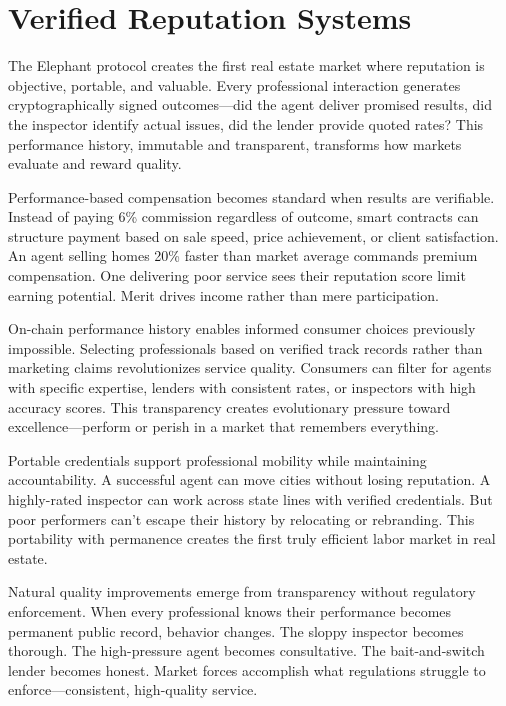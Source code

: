 \section{Verified Reputation Systems}

The Elephant protocol creates the first real estate market where reputation is objective, portable, and valuable. Every professional interaction generates cryptographically signed outcomes—did the agent deliver promised results, did the inspector identify actual issues, did the lender provide quoted rates? This performance history, immutable and transparent, transforms how markets evaluate and reward quality.

Performance-based compensation becomes standard when results are verifiable. Instead of paying 6\% commission regardless of outcome, smart contracts can structure payment based on sale speed, price achievement, or client satisfaction. An agent selling homes 20\% faster than market average commands premium compensation. One delivering poor service sees their reputation score limit earning potential. Merit drives income rather than mere participation.

On-chain performance history enables informed consumer choices previously impossible. Selecting professionals based on verified track records rather than marketing claims revolutionizes service quality. Consumers can filter for agents with specific expertise, lenders with consistent rates, or inspectors with high accuracy scores. This transparency creates evolutionary pressure toward excellence—perform or perish in a market that remembers everything.

Portable credentials support professional mobility while maintaining accountability. A successful agent can move cities without losing reputation. A highly-rated inspector can work across state lines with verified credentials. But poor performers can't escape their history by relocating or rebranding. This portability with permanence creates the first truly efficient labor market in real estate.

Natural quality improvements emerge from transparency without regulatory enforcement. When every professional knows their performance becomes permanent public record, behavior changes. The sloppy inspector becomes thorough. The high-pressure agent becomes consultative. The bait-and-switch lender becomes honest. Market forces accomplish what regulations struggle to enforce—consistent, high-quality service.

